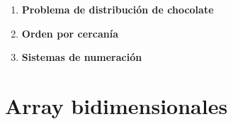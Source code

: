 \begin{enumerate}
    \item \textbf{Problema de distribución de chocolate}\\
    

    \item \textbf{Orden por cercanía}\\
    

    \item \textbf{Sistemas de numeración}\\
    
\end{enumerate}

\newpage
\section{Array bidimensionales}
